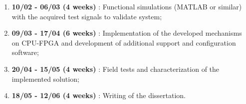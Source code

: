 \begin{enumerate}
	\item \textbf{10/02 - 06/03 (4 weeks)} : Functional simulations (MATLAB or similar) with the acquired test signals to validate system;
	\item \textbf{09/03 - 17/04 (6 weeks)} : Implementation of the developed mechanisms on CPU-FPGA and development of additional support and configuration software;
	\item \textbf{20/04 - 15/05 (4 weeks)} : Field tests and characterization of the implemented solution;
	\item \textbf{18/05 - 12/06 (4 weeks)} : Writing of the dissertation.
	
\end{enumerate}
